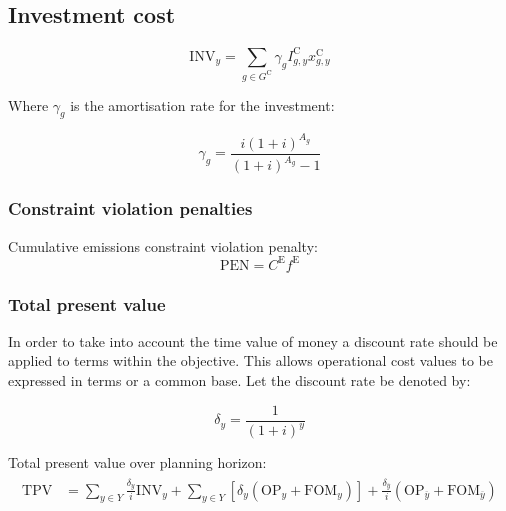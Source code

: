 \documentclass{article}
\newcommand{\sGeneratorsCandidate}{G^{\mathrm{C}}}
\newcommand{\sYears}{Y}
\newcommand{\iGenerator}{g}
\newcommand{\iYear}{y}
\newcommand{\iYearTerminal}{\overline{\iYear}}
\newcommand{\iScenario}{s}
\newcommand{\cOperatingCost}[1][\iYear,\iScenario]{\mathrm{OP}_{#1}}
\newcommand{\cFixedOperationsMaintenanceCost}[1][\iYear]{\mathrm{FOM}_{#1}}
\newcommand{\cAmortisationRate}[1][\iGenerator]{\gamma_{#1}}
\newcommand{\cCandidateInvestmentCost}[1][\iGenerator,\iYear]{I^{\mathrm{C}}_{#1}}
\newcommand{\cInvestmentCost}[1][\iYear]{\mathrm{INV}_{#1}}
\newcommand{\cInterestRate}{i}
\newcommand{\cAssetLifetime}[1][\iGenerator]{A_{#1}}
\newcommand{\cTotalPresentValue}[1][]{\mathrm{TPV}_{#1}}
\newcommand{\cEmissionsTargetViolationPenalty}{C^{\mathrm{E}}}
\newcommand{\cEmissionsViolationTotalCost}{\mathrm{PEN}}
\newcommand{\cDiscountRate}[1][\iYear]{\delta_{#1}}
\newcommand{\vInstalledCapacity}[1][\iGenerator,\iYear]{x^{\mathrm{C}}_{#1}}
\newcommand{\vEmissionsTargetViolation}{f^{\mathrm{E}}}
\begin{document}
\subsection{Investment cost}

\begin{equation}
\cInvestmentCost = \sum\limits_{g\in \sGeneratorsCandidate} \cAmortisationRate  \cCandidateInvestmentCost \vInstalledCapacity
\end{equation}

Where $\cAmortisationRate$ is the amortisation rate for the investment:

\begin{equation}
\cAmortisationRate = \frac{\cInterestRate(1+\cInterestRate)^{\cAssetLifetime}}{(1+\cInterestRate)^{\cAssetLifetime} - 1}
\end{equation}

\subsubsection{Constraint violation penalties}
Cumulative emissions constraint violation penalty:
\begin{equation}
\cEmissionsViolationTotalCost = \cEmissionsTargetViolationPenalty \vEmissionsTargetViolation
\end{equation}

\subsubsection{Total present value}
In order to take into account the time value of money a discount rate should be applied to terms within the objective. This allows operational cost values to be expressed in terms or a common base. Let the discount rate be denoted by:

\begin{equation}
	\cDiscountRate = \frac{1}{(1 + \cInterestRate)^{\iYear}}
\end{equation}

Total present value over planning horizon:
\begin{align}
\begin{split}
\cTotalPresentValue & = \sum\limits_{\iYear \in \sYears} \frac{\cDiscountRate}{\cInterestRate}\cInvestmentCost + \sum\limits_{\iYear \in \sYears} \left[\cDiscountRate (\cOperatingCost[\iYear] + \cFixedOperationsMaintenanceCost) \right] + \frac{\cDiscountRate[\iYearTerminal]}{\cInterestRate} \left(\cOperatingCost[\iYearTerminal] + \cFixedOperationsMaintenanceCost[\iYearTerminal] \right)
\end{split}
\end{align}
\end{document}
